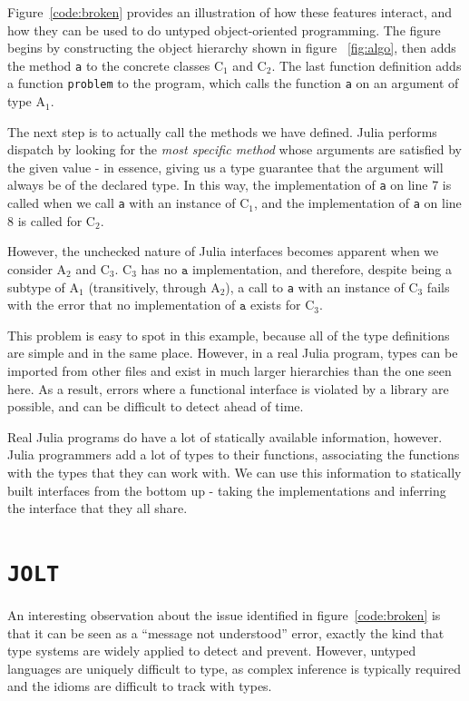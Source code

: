 \documentclass[preprint]{sigplanconf}
\newcommand{\xt}[1]{\texttt{#1}}
\newcommand{\jolt}{\xt{JOLT}}
\newcommand{\cnum}[2]{$\text{#1}_#2$}
\begin{document}
Figure~\ref{code:broken} provides an illustration of how these features 
interact, and how they can be used to do untyped object-oriented programming.
The figure begins by constructing the object hierarchy shown in figure~
\ref{fig:algo}, then adds the method \xt{a} to the concrete classes $\text{C}_1$ and
$\text{C}_2$. The last function definition adds a function \xt{problem} to the
program, which calls the function \xt{a} on an argument of type $\text{A}_1$.

The next step is to actually call the methods we have defined. Julia performs
dispatch by looking for the \emph{most specific method} whose arguments are
satisfied by the given value - in essence, giving us a type guarantee that the
argument will always be of the declared type. In this way, the implementation 
of \xt{a} on line 7 is called when we call \xt{a} with an instance of $\text{C}_1$,
and the implementation of \xt{a} on line 8 is called for $\text{C}_2$.

However, the unchecked nature of Julia interfaces becomes apparent when we consider
$\text{A}_2$ and $\text{C}_3$. \cnum{C}{3} has no $\xt{a}$ implementation, and
therefore, despite being a subtype of \cnum{A}{1} 
(transitively, through \cnum{A}{2}), a call to \xt{a} with an instance of \cnum{C}{3}
fails with the error that no implementation of $\xt{a}$ exists for \cnum{C}{3}.

This problem is easy to spot in this example, because all of the type definitions
are simple and in the same place. However, in a real Julia program, types can be
imported from other files and exist in much larger hierarchies than the one seen
here. As a result, errors where a functional interface is violated by a library
are possible, and can be difficult to detect ahead of time.

Real Julia programs do have a lot of statically available information, however.
Julia programmers add a lot of types to their functions, associating the functions
with the types that they can work with. We can use this information to statically
built interfaces from the bottom up - taking the implementations and inferring the
interface that they all share.

\section{\jolt}
An interesting observation about the issue identified in figure~\ref{code:broken}
is that it can be seen as a ``message not understood'' error, exactly the kind
that type systems are widely applied to detect and prevent. However, untyped 
languages are uniquely difficult to type, as complex inference is typically
required and the idioms are difficult to track with types.
\end{document}
